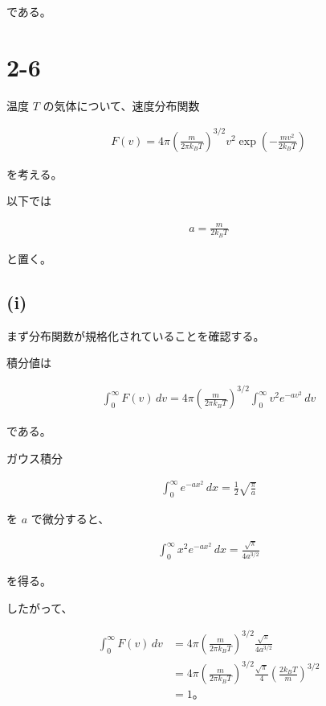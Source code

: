 \documentclass[platex,dvipdfmx,a4paper]{jsarticle}
\begin{document}
である。
\section{2-6}

温度 $T$ の気体について、速度分布関数

\begin{align*}
F(v)
=
4\pi
\left(
\frac{m}{2\pi k_BT}
\right)^{3/2}
v^2
\exp\left(
-\frac{mv^2}{2k_BT}
\right)
\end{align*}

を考える。

以下では

\begin{align*}
a
=
\frac{m}{2k_BT}
\end{align*}

と置く。

\subsection{(i)}

まず分布関数が規格化されていることを確認する。

積分値は

\begin{align*}
\int_0^\infty F(v)\,dv
=
4\pi
\left(
\frac{m}{2\pi k_BT}
\right)^{3/2}
\int_0^\infty
v^2e^{-av^2}\,dv
\end{align*}

である。

ガウス積分

\begin{align*}
\int_0^\infty e^{-ax^2}\,dx
=
\frac12\sqrt{\frac{\pi}{a}}
\end{align*}

を $a$ で微分すると、

\begin{align*}
\int_0^\infty x^2e^{-ax^2}\,dx
=
\frac{\sqrt{\pi}}{4a^{3/2}}
\end{align*}

を得る。

したがって、

\begin{align*}
\int_0^\infty F(v)\,dv
&=
4\pi
\left(
\frac{m}{2\pi k_BT}
\right)^{3/2}
\frac{\sqrt{\pi}}{4a^{3/2}} \\
&=
4\pi
\left(
\frac{m}{2\pi k_BT}
\right)^{3/2}
\frac{\sqrt{\pi}}{4}
\left(
\frac{2k_BT}{m}
\right)^{3/2} \\
&=
1。
\end{align*}
\end{document}
